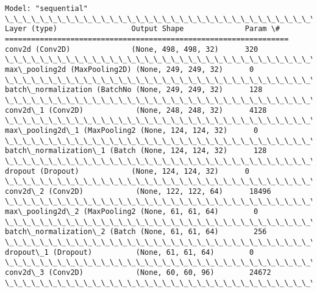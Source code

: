 \documentclass[11pt]{uc3mpracticas}
\begin{document}
    \begin{Verbatim}[commandchars=\\\{\}]
Model: "sequential"
\_\_\_\_\_\_\_\_\_\_\_\_\_\_\_\_\_\_\_\_\_\_\_\_\_\_\_\_\_\_\_\_\_\_\_\_\_\_\_\_\_\_\_\_\_\_\_\_\_\_\_\_\_\_\_\_\_\_\_\_\_\_\_\_\_
Layer (type)                 Output Shape              Param \#
=================================================================
conv2d (Conv2D)              (None, 498, 498, 32)      320
\_\_\_\_\_\_\_\_\_\_\_\_\_\_\_\_\_\_\_\_\_\_\_\_\_\_\_\_\_\_\_\_\_\_\_\_\_\_\_\_\_\_\_\_\_\_\_\_\_\_\_\_\_\_\_\_\_\_\_\_\_\_\_\_\_
max\_pooling2d (MaxPooling2D) (None, 249, 249, 32)      0
\_\_\_\_\_\_\_\_\_\_\_\_\_\_\_\_\_\_\_\_\_\_\_\_\_\_\_\_\_\_\_\_\_\_\_\_\_\_\_\_\_\_\_\_\_\_\_\_\_\_\_\_\_\_\_\_\_\_\_\_\_\_\_\_\_
batch\_normalization (BatchNo (None, 249, 249, 32)      128
\_\_\_\_\_\_\_\_\_\_\_\_\_\_\_\_\_\_\_\_\_\_\_\_\_\_\_\_\_\_\_\_\_\_\_\_\_\_\_\_\_\_\_\_\_\_\_\_\_\_\_\_\_\_\_\_\_\_\_\_\_\_\_\_\_
conv2d\_1 (Conv2D)            (None, 248, 248, 32)      4128
\_\_\_\_\_\_\_\_\_\_\_\_\_\_\_\_\_\_\_\_\_\_\_\_\_\_\_\_\_\_\_\_\_\_\_\_\_\_\_\_\_\_\_\_\_\_\_\_\_\_\_\_\_\_\_\_\_\_\_\_\_\_\_\_\_
max\_pooling2d\_1 (MaxPooling2 (None, 124, 124, 32)      0
\_\_\_\_\_\_\_\_\_\_\_\_\_\_\_\_\_\_\_\_\_\_\_\_\_\_\_\_\_\_\_\_\_\_\_\_\_\_\_\_\_\_\_\_\_\_\_\_\_\_\_\_\_\_\_\_\_\_\_\_\_\_\_\_\_
batch\_normalization\_1 (Batch (None, 124, 124, 32)      128
\_\_\_\_\_\_\_\_\_\_\_\_\_\_\_\_\_\_\_\_\_\_\_\_\_\_\_\_\_\_\_\_\_\_\_\_\_\_\_\_\_\_\_\_\_\_\_\_\_\_\_\_\_\_\_\_\_\_\_\_\_\_\_\_\_
dropout (Dropout)            (None, 124, 124, 32)      0
\_\_\_\_\_\_\_\_\_\_\_\_\_\_\_\_\_\_\_\_\_\_\_\_\_\_\_\_\_\_\_\_\_\_\_\_\_\_\_\_\_\_\_\_\_\_\_\_\_\_\_\_\_\_\_\_\_\_\_\_\_\_\_\_\_
conv2d\_2 (Conv2D)            (None, 122, 122, 64)      18496
\_\_\_\_\_\_\_\_\_\_\_\_\_\_\_\_\_\_\_\_\_\_\_\_\_\_\_\_\_\_\_\_\_\_\_\_\_\_\_\_\_\_\_\_\_\_\_\_\_\_\_\_\_\_\_\_\_\_\_\_\_\_\_\_\_
max\_pooling2d\_2 (MaxPooling2 (None, 61, 61, 64)        0
\_\_\_\_\_\_\_\_\_\_\_\_\_\_\_\_\_\_\_\_\_\_\_\_\_\_\_\_\_\_\_\_\_\_\_\_\_\_\_\_\_\_\_\_\_\_\_\_\_\_\_\_\_\_\_\_\_\_\_\_\_\_\_\_\_
batch\_normalization\_2 (Batch (None, 61, 61, 64)        256
\_\_\_\_\_\_\_\_\_\_\_\_\_\_\_\_\_\_\_\_\_\_\_\_\_\_\_\_\_\_\_\_\_\_\_\_\_\_\_\_\_\_\_\_\_\_\_\_\_\_\_\_\_\_\_\_\_\_\_\_\_\_\_\_\_
dropout\_1 (Dropout)          (None, 61, 61, 64)        0
\_\_\_\_\_\_\_\_\_\_\_\_\_\_\_\_\_\_\_\_\_\_\_\_\_\_\_\_\_\_\_\_\_\_\_\_\_\_\_\_\_\_\_\_\_\_\_\_\_\_\_\_\_\_\_\_\_\_\_\_\_\_\_\_\_
conv2d\_3 (Conv2D)            (None, 60, 60, 96)        24672
\_\_\_\_\_\_\_\_\_\_\_\_\_\_\_\_\_\_\_\_\_\_\_\_\_\_\_\_\_\_\_\_\_\_\_\_\_\_\_\_\_\_\_\_\_\_\_\_\_\_\_\_\_\_\_\_\_\_\_\_\_\_\_\_\_

\end{Verbatim}
\end{document}
